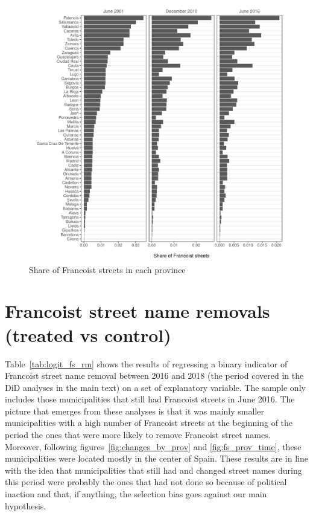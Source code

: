 \documentclass[12pt, titlepage]{article}
\begin{document}
\begin{figure}[htb!]
\centering

  \includegraphics[width = \textwidth]{img/fs_by_prov}

  \caption{Share of Francoist streets in each province}\label{fig:fs_by_prov}

\end{figure}

\clearpage
\section{Francoist street name removals (treated vs control)}

Table~\ref{tab:logit_fs_rm} shows the results of regressing a binary indicator of Francoist street name removal between 2016 and 2018 (the period covered in the DiD analyses in the main text) on a set of explanatory variable.
The sample only includes those municipalities that still had Francoist streets in June 2016.
The picture that emerges from these analyses is that it was mainly smaller municipalities with a high number of Francoist streets at the beginning of the period the ones that were more likely to remove Francoist street names.
Moreover, following figures~\ref{fig:changes_by_prov} and \ref{fig:fs_prov_time}, these municipalities were located mostly in the center of Spain.
These results are in line with the idea that municipalities that still had and changed street names during this period were probably the ones that had not done so because of political inaction and that, if anything, the selection bias goes against our main hypothesis.
\end{document}
